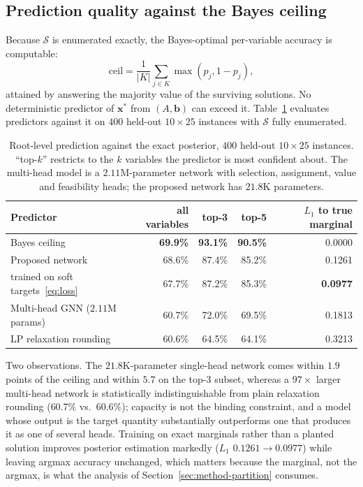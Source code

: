 \documentclass[11pt]{article}
\newcommand{\SOL}{\mathcal{S}}
\begin{document}
\subsection{Prediction quality against the Bayes ceiling}
\label{sec:exp-ceiling}

Because $\SOL$ is enumerated exactly, the Bayes-optimal per-variable accuracy is computable:
\begin{equation}
\mathrm{ceil} = \frac{1}{|K|}\sum_{j\in K}\max(p_j, 1-p_j),
\label{eq:ceiling}
\end{equation}
attained by answering the majority value of the surviving solutions. No deterministic predictor of $\mathbf{x}^\ast$ from $(A,\mathbf{b})$ can exceed it. Table~\ref{tab:ceiling} evaluates predictors against it on $400$ held-out $10\times25$ instances with $\SOL$ fully enumerated.

\begin{table}[h]
\centering
\begin{tabular}{lrrrr}
\toprule
Predictor & all variables & top-3 & top-5 & $L_1$ to true marginal \\
\midrule
Bayes ceiling & \textbf{69.9\%} & \textbf{93.1\%} & \textbf{90.5\%} & 0.0000 \\
Proposed network & 68.6\% & 87.4\% & 85.2\% & 0.1261 \\
\quad trained on soft targets~\eqref{eq:loss} & 67.7\% & 87.2\% & 85.3\% & \textbf{0.0977} \\
Multi-head GNN ($2.11$M params) & 60.7\% & 72.0\% & 69.5\% & 0.1813 \\
LP relaxation rounding & 60.6\% & 64.5\% & 64.1\% & 0.3213 \\
\bottomrule
\end{tabular}
\caption{Root-level prediction against the exact posterior, $400$ held-out $10\times25$ instances. ``top-$k$'' restricts to the $k$ variables the predictor is most confident about. The multi-head model is a $2.11$M-parameter network with selection, assignment, value and feasibility heads; the proposed network has $21.8$K parameters.}
\label{tab:ceiling}
\end{table}

Two observations. The $21.8$K-parameter single-head network comes within $1.9$ points of the ceiling and within $5.7$ on the top-3 subset, whereas a $97\times$ larger multi-head network is statistically indistinguishable from plain relaxation rounding ($60.7\%$ vs.\ $60.6\%$); capacity is not the binding constraint, and a model whose output is the target quantity substantially outperforms one that produces it as one of several heads. Training on exact marginals rather than a planted solution improves posterior estimation markedly ($L_1$ $0.1261\to0.0977$) while leaving argmax accuracy unchanged, which matters because the marginal, not the argmax, is what the analysis of Section~\ref{sec:method-partition} consumes.
\end{document}
